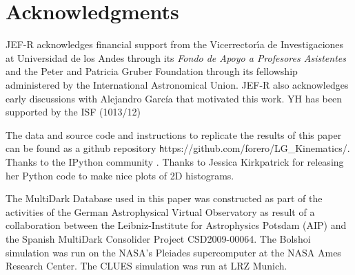 \documentclass{emulateapj}
\begin{document}
\label{sec:conclusions}
\section*{Acknowledgments}  
JEF-R acknowledges financial support from the Vicerrector\'{\i}a de
Investigaciones at Universidad de los Andes through its {\it Fondo de
  Apoyo a Profesores Asistentes} and the Peter and Patricia Gruber
Foundation through its fellowship administered by the International
Astronomical Union. JEF-R also acknowledges early discussions with
Alejandro Garc\'ia that motivated this work. YH has been supported by
the ISF (1013/12) 

The data and source code and instructions to replicate the results of
this paper can be found as a github repository {\texttt
  https://github.com/forero/LG\_Kinematics/}. Thanks to the IPython
community \citep{IPython}. Thanks to Jessica Kirkpatrick for releasing
her Python code to make nice plots of 2D histograms.  

The MultiDark Database used in this paper  was constructed as part of
the activities of the German Astrophysical Virtual Observatory as
result of a collaboration between the Leibniz-Institute for
Astrophysics Potsdam (AIP) and the Spanish MultiDark Consolider
Project CSD2009-00064. The Bolshoi simulation was run on the NASA's
Pleiades supercomputer at the NASA Ames Research Center. The CLUES simulation
was run at LRZ Munich.
\end{document}
